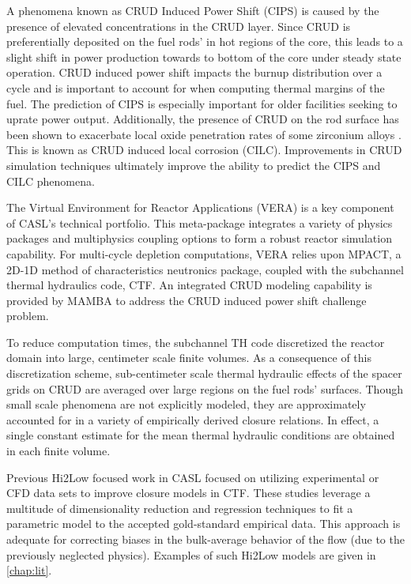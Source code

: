 A phenomena known as CRUD Induced Power Shift (CIPS) is caused by the presence
of elevated  concentrations in the CRUD layer.  Since CRUD is preferentially
deposited on the fuel rods' in hot regions of the core, this leads to a slight shift in
power production towards to bottom of the core under steady state operation.  
CRUD induced power shift impacts the burnup distribution over a cycle
and is important to account for when computing thermal
margins of the fuel.  The prediction
of CIPS is especially important for older facilities seeking to uprate power
output.  Additionally, the presence of CRUD on the rod surface has been shown
to exacerbate local oxide penetration rates of some zirconium alloys \cite{adamson07}.
This is known as CRUD induced local corrosion (CILC).  Improvements in CRUD
simulation techniques ultimately improve the ability to predict the CIPS and
CILC phenomena.

The Virtual Environment for Reactor Applications (VERA) is a key component of
CASL's technical portfolio.  This meta-package integrates a variety of physics
packages and multiphysics coupling options to form a robust reactor simulation
capability.  For multi-cycle depletion computations, VERA relies upon MPACT, a
2D-1D method of characteristics neutronics package, coupled with the subchannel
thermal hydraulics code, CTF.  An integrated CRUD modeling capability
is provided by MAMBA to address the CRUD induced power shift challenge problem.

To reduce computation times, the subchannel TH code discretized the reactor
domain into large, centimeter scale finite volumes. As a consequence of this
discretization scheme, sub-centimeter scale thermal hydraulic effects of the
spacer grids on CRUD are averaged over large regions on the fuel rods'
surfaces.  Though small scale phenomena are not explicitly modeled, they are
approximately accounted for in a variety of empirically derived closure
relations.  In effect, a single constant estimate for the mean thermal
hydraulic conditions are obtained in each finite volume.

Previous Hi2Low focused work in CASL focused on utilizing experimental or CFD
data sets to improve closure models in CTF.  These studies leverage a multitude
of dimensionality reduction and regression techniques to fit a parametric model
to the accepted gold-standard empirical data.  This approach is adequate for
correcting biases in the bulk-average behavior of the flow (due to the
previously neglected physics).  Examples of such Hi2Low models are given in
\autoref{chap:lit}.

